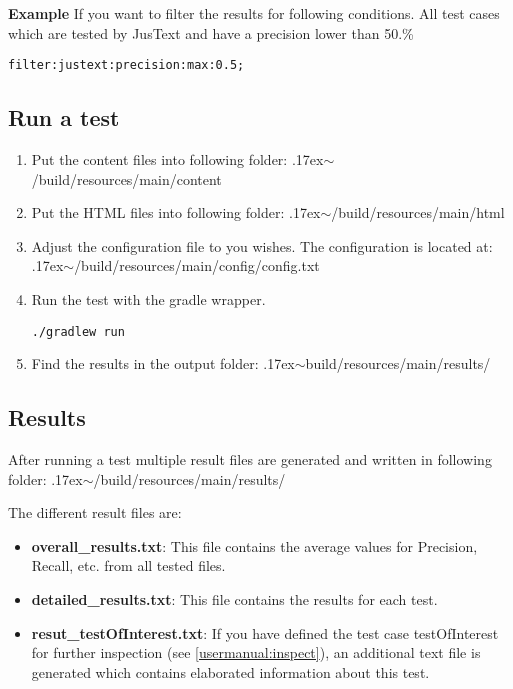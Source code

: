 \textbf{Example} \linebreak
If you want to filter the results for following conditions. All test cases which are tested by JusText and have a precision lower than 50.\% 

\begin{lstlisting}
filter:justext:precision:max:0.5;
\end{lstlisting}

\subsection{Run a test}

\begin{enumerate}
\item Put the content files into following folder: {\raise.17ex\hbox{$\scriptstyle\sim$}}/build/resources/main/content
\item Put the HTML files into following folder: {\raise.17ex\hbox{$\scriptstyle\sim$}}/build/resources/main/html
\item Adjust the configuration file to you wishes. The configuration is located at: {\raise.17ex\hbox{$\scriptstyle\sim$}}/build/resources/main/config/config.txt
\item Run the test with the gradle wrapper.

\begin{lstlisting}
./gradlew run
\end{lstlisting}
\item Find the results in the output folder: {\raise.17ex\hbox{$\scriptstyle\sim$}}build/resources/main/results/
\end{enumerate}

\subsection{Results}

After running a test multiple result files are generated and written in following folder: {\raise.17ex\hbox{$\scriptstyle\sim$}}/build/resources/main/results/

The different result files are:
\begin{itemize}

\item \textbf{overall\_results.txt}: This file contains the average values for Precision, Recall, etc. from all tested files.
\item \textbf{detailed\_results.txt}: This file contains the results for each test. 
\item \textbf{resut\_testOfInterest.txt}: If you have defined the test case testOfInterest for further inspection (see \ref{usermanual:inspect}), an additional text file is generated which contains elaborated information about this test.
\end{itemize}